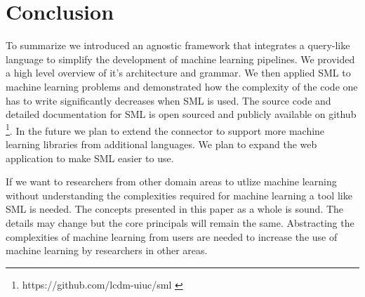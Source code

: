 \documentclass[jair,twoside,11pt,theapa]{article}
\begin{document}
\section{Conclusion}
\label{conclusion}
To summarize we introduced an agnostic framework that integrates a query-like language to simplify the development of machine learning pipelines. We provided a high level overview of it's architecture and grammar. We then applied SML to machine learning problems and demonstrated how the complexity of the code one has to write significantly decreases when SML is used. The source code and detailed documentation for SML is open sourced and publicly available on github \footnote{https://github.com/lcdm-uiuc/sml \label{SML:Github}}. In the future we plan to extend the connector to support more machine learning libraries from additional languages. We plan to expand the web application to make SML easier to use.

If we want to researchers from other domain areas to utlize machine learning without understanding the complexities required for machine learning a tool like SML is needed. The concepts presented in this paper as a whole is sound. The details may change but the core principals will remain the same. Abstracting the complexities of machine learning from users are needed to increase the use of machine learning by researchers in other areas.



\vskip 0.2in


\end{document}
